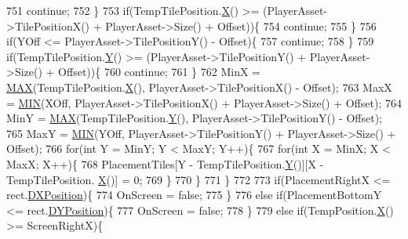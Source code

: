 \begin{DoxyCode}
751                 \textcolor{keywordflow}{continue};   
752             \}
753             \textcolor{keywordflow}{if}(TempTilePosition.\hyperlink{classCPosition_a9a6b94d3b91df1492d166d9964c865fc}{X}() >= (PlayerAsset->TilePositionX() + PlayerAsset->Size() + Offset))\{
754                 \textcolor{keywordflow}{continue};   
755             \}
756             \textcolor{keywordflow}{if}(YOff <= PlayerAsset->TilePositionY() - Offset)\{
757                 \textcolor{keywordflow}{continue};   
758             \}
759             \textcolor{keywordflow}{if}(TempTilePosition.\hyperlink{classCPosition_a1aa8a30e2f08dda1f797736ba8c13a87}{Y}() >= (PlayerAsset->TilePositionY() + PlayerAsset->Size() + Offset))\{
760                 \textcolor{keywordflow}{continue};   
761             \}
762             MinX = \hyperlink{AssetDecoratedMap_8cpp_afa99ec4acc4ecb2dc3c2d05da15d0e3f}{MAX}(TempTilePosition.\hyperlink{classCPosition_a9a6b94d3b91df1492d166d9964c865fc}{X}(), PlayerAsset->TilePositionX() - Offset);
763             MaxX = \hyperlink{AssetDecoratedMap_8cpp_a3acffbd305ee72dcd4593c0d8af64a4f}{MIN}(XOff, PlayerAsset->TilePositionX() + PlayerAsset->Size() + Offset);
764             MinY = \hyperlink{AssetDecoratedMap_8cpp_afa99ec4acc4ecb2dc3c2d05da15d0e3f}{MAX}(TempTilePosition.\hyperlink{classCPosition_a1aa8a30e2f08dda1f797736ba8c13a87}{Y}(), PlayerAsset->TilePositionY() - Offset);
765             MaxY = \hyperlink{AssetDecoratedMap_8cpp_a3acffbd305ee72dcd4593c0d8af64a4f}{MIN}(YOff, PlayerAsset->TilePositionY() + PlayerAsset->Size() + Offset);
766             \textcolor{keywordflow}{for}(\textcolor{keywordtype}{int} Y = MinY; Y < MaxY; Y++)\{
767                 \textcolor{keywordflow}{for}(\textcolor{keywordtype}{int} X = MinX; X < MaxX; X++)\{
768                     PlacementTiles[Y - TempTilePosition.\hyperlink{classCPosition_a1aa8a30e2f08dda1f797736ba8c13a87}{Y}()][X - TempTilePosition.
      \hyperlink{classCPosition_a9a6b94d3b91df1492d166d9964c865fc}{X}()] = 0;
769                 \}
770             \}
771         \}
772         
773         \textcolor{keywordflow}{if}(PlacementRightX <= rect.\hyperlink{structSRectangle_abcbddb03b3ee416cc33109833b5f075c}{DXPosition})\{
774             OnScreen = \textcolor{keyword}{false};
775         \}
776         \textcolor{keywordflow}{else} \textcolor{keywordflow}{if}(PlacementBottomY <= rect.\hyperlink{structSRectangle_a120aa0a90033bc6e07c36c151a3bbc71}{DYPosition})\{
777             OnScreen = \textcolor{keyword}{false};
778         \}
779         \textcolor{keywordflow}{else} \textcolor{keywordflow}{if}(TempPosition.\hyperlink{classCPosition_a9a6b94d3b91df1492d166d9964c865fc}{X}() >= ScreenRightX)\{

\end{DoxyCode}
